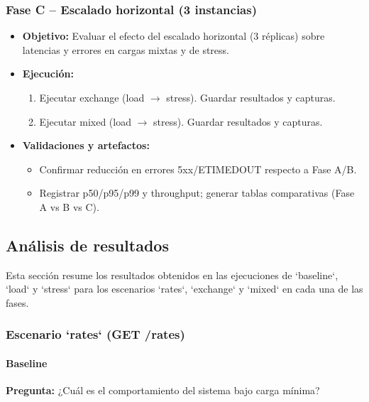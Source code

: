\subsubsection{Fase C -- Escalado horizontal (3 instancias)}

\begin{itemize}[leftmargin=*]
    \item \textbf{Objetivo:} Evaluar el efecto del escalado horizontal (3 réplicas) sobre latencias y errores en cargas mixtas y de stress.

    \item \textbf{Ejecución:}
    \begin{enumerate}[leftmargin=2em]
        \item Ejecutar exchange (load $\rightarrow$ stress). Guardar resultados y capturas.
        \item Ejecutar mixed (load $\rightarrow$ stress). Guardar resultados y capturas.
    \end{enumerate}

    \item \textbf{Validaciones y artefactos:}
    \begin{itemize}[leftmargin=2em]
        \item Confirmar reducción en errores 5xx/ETIMEDOUT respecto a Fase A/B.
        \item Registrar p50/p95/p99 y throughput; generar tablas comparativas (Fase A vs B vs C).
    \end{itemize}
\end{itemize}


\subsection{Análisis de resultados}

Esta sección resume los resultados obtenidos en las ejecuciones de `baseline`, `load` y `stress` para los escenarios `rates`, `exchange` y `mixed` en cada una de las fases.

\subsubsection{Escenario `rates` (GET /rates)}

\paragraph{Baseline}
\textbf{Pregunta:} ¿Cuál es el comportamiento del sistema bajo carga mínima?

